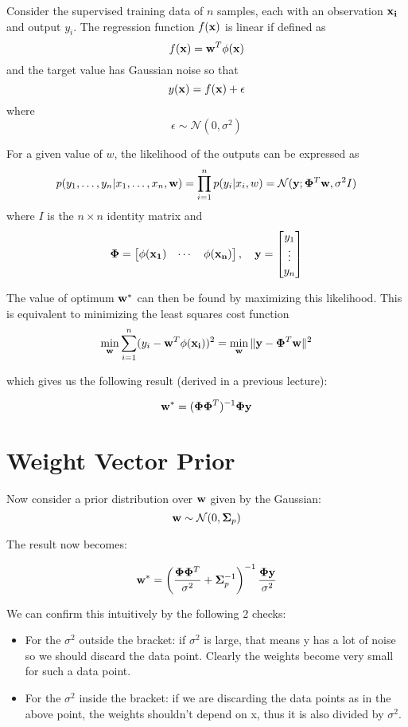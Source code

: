 \documentclass[12pt]{article}
\begin{document}
\noindent Consider the supervised training data of $n$ samples, each with an observation $\bold{x_i}$ and output $y_i$. The regression function $f(\bold{x})$ is linear if defined as
$$f(\bold{x}) = \bold{w}^T\phi(\bold{x})$$
and the target value has Gaussian noise so that
$$y(\bold{x}) = f(\bold{x}) + \epsilon$$
where
\[\epsilon \sim \mathcal{N}(0, \sigma^2)\]

\noindent For a given value of $w$, the likelihood of the outputs can be expressed as
$$p(y_1, \dots, y_n | x_1, \dots, x_n, \bold{w}) = \prod_{i=1}^{n} p(y_i | x_i, w) = \mathcal{N}(\bold{y}; \bold{\Phi}^T\bold{w}, \sigma^2 I)$$
where $I$ is the $n \times n$ identity matrix and
$$\bold{\Phi} = \begin{bmatrix} \phi(\bold{x_1}) & \cdots & \phi(\bold{x_n}) \end{bmatrix}, \quad \bold{y} = \begin{bmatrix} y_1 \\ \vdots \\ y_n \end{bmatrix}$$

\noindent The value of optimum $\bold{w}^*$ can then be found by maximizing this likelihood. This is equivalent to minimizing the least squares cost function
$$\min_{\bold{w}} \sum_{i=1}^{n} (y_i - \bold{w}^T\phi(\bold{x_i}))^2 = \min_{\bold{w}} \| \bold{y} - \bold{\Phi}^T\bold{w} \|^2$$

\noindent which gives us the following result (derived in a previous lecture):

\[\bold{w}^* = (\bold{\Phi}\bold{\Phi}^T)^{-1}\bold{\Phi}\bold{y}\]

\section{Weight Vector Prior}

\noindent Now consider a prior distribution over $\bold{w}$ given by the Gaussian:
\[\bold{w} \sim \mathcal{N}(0,\bold{\Sigma}_p)\]

\noindent The result now becomes:

\[\bold{w}^* = \left(\frac{\bold{\Phi}\bold{\Phi}^T}{\sigma^2}+\bold{\Sigma}_p^{-1}\right)^{-1}\frac{\bold{\Phi}\bold{y}}{\sigma^2}\]

\noindent We can confirm this intuitively by the following 2 checks:
\begin{itemize}
    \item For the $\sigma^2$ outside the bracket: if $\sigma^2$ is large, that means y has a lot of noise so we should discard the data point. Clearly the weights become very small for such a data point.
    \item For the $\sigma^2$ inside the bracket: if we are discarding the data points as in the above point, the weights shouldn't depend on x, thus it is also divided by $\sigma^2$.
\end{itemize}
\end{document}

